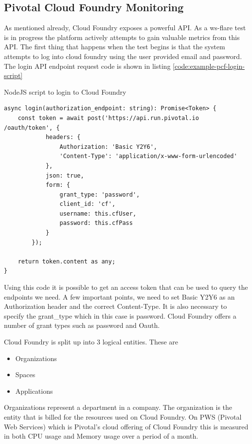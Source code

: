\subsection{Pivotal Cloud Foundry Monitoring}

As mentioned already, Cloud Foundry exposes a powerful API. As a ws-flare test is in progress the platform  actively attempts to gain valuable metrics from this API. The first thing that happens when the test begins is that the system attempts to log into cloud foundry using the user provided email and password. The login API endpoint request code is shown in listing \ref{code:example-pcf-login-script}

\begin{listing}[H]
    \caption{NodeJS script to login to Cloud Foundry}
    \label{code:example-pcf-login-script}
    \begin{verbatim}
async login(authorization_endpoint: string): Promise<Token> {
    const token = await post('https://api.run.pivotal.io
/oauth/token', {
            headers: {
                Authorization: 'Basic Y2Y6',
                'Content-Type': 'application/x-www-form-urlencoded'
            },
            json: true,
            form: {
                grant_type: 'password',
                client_id: 'cf',
                username: this.cfUser,
                password: this.cfPass
            }
        });

    return token.content as any;
}
\end{verbatim}
\end{listing}

Using this code it is possible to get an access token that can be used to query the endpoints we need. A few important points, we need to set Basic Y2Y6 as an Authorization header and the correct Content-Type. It is also necessary to specify the grant\_type which in this case is password. Cloud Foundry offers a number of grant types such as password and Oauth. 

Cloud Foundry is split up into 3 logical entities. These are

\begin{itemize}
  \item Organizations
  \item Spaces
  \item Applications
\end{itemize}

Organizations represent a department in a company. The organization is the entity that is billed for the resources used on Cloud Foundry. On PWS (Pivotal Web Services) which is Pivotal's cloud offering of Cloud Foundry this is measured in both CPU usage and Memory usage over a period of a month.

